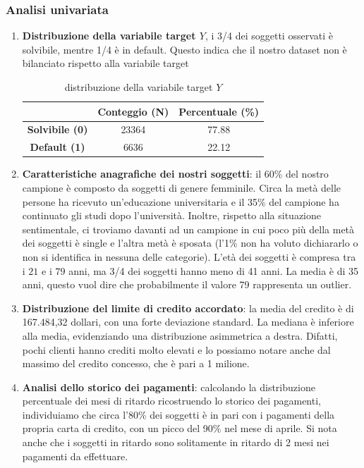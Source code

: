 \documentclass{article}
\begin{document}
\subsubsection{Analisi univariata}
\begin{enumerate}
    \item \textbf{Distribuzione della variabile target $Y$}, i 3/4 dei soggetti osservati \`e solvibile, mentre 1/4 \`e in default. Questo indica che il nostro dataset non \`e bilanciato rispetto alla variabile target
    \begin{table}[htbp]
    \centering
    \begin{tabular}{ccc}
    \toprule
    \textbf{} & \textbf{Conteggio (N)} & \textbf{Percentuale (\%)} \\
    \midrule
    \textbf{Solvibile (0)} & 23364 & 77.88 \\
    \textbf{Default (1)} & 6636 & 22.12 \\
    \bottomrule
    \end{tabular}
    \caption{distribuzione della variabile target $Y$}
    \label{tab:mia_tabella}
    \end{table}

    \item \textbf{Caratteristiche anagrafiche dei nostri soggetti}: il 60\% del nostro campione \`e composto da soggetti di genere femminile. Circa la met\`a delle persone ha ricevuto un'educazione universitaria e il 35\% del campione ha continuato gli studi dopo l'universit\`a. Inoltre, rispetto alla situazione sentimentale, ci troviamo davanti ad un campione in cui poco pi\`u della met\`a dei soggetti \`e single e l'altra met\`a \`e sposata (l'1\% non ha voluto dichiararlo o non si identifica in nessuna delle categorie). L'et\`a dei soggetti \`e compresa tra i $21$ e i $79$ anni, ma 3/4 dei soggetti hanno meno di 41 anni. La media \`e di 35 anni, questo vuol dire che probabilmente il valore 79 rappresenta un outlier.

    \item \textbf{Distribuzione del limite di credito accordato}: la media del credito \`e di 167.484,32 dollari, con una forte deviazione standard. La mediana \`e inferiore alla media, evidenziando una distribuzione asimmetrica a destra. Difatti, pochi clienti hanno crediti molto elevati e lo possiamo notare anche dal massimo del credito concesso, che \`e pari a 1 milione.

    \item \textbf{Analisi dello storico dei pagamenti}: calcolando la distribuzione percentuale dei mesi di ritardo ricostruendo lo storico dei pagamenti, individuiamo che circa l'80\% dei soggetti \`e in pari con i pagamenti della propria carta di credito, con un picco del 90\% nel mese di aprile. Si nota anche che i soggetti in ritardo sono solitamente in ritardo di 2 mesi nei pagamenti da effettuare. 


\end{enumerate}
\end{document}
